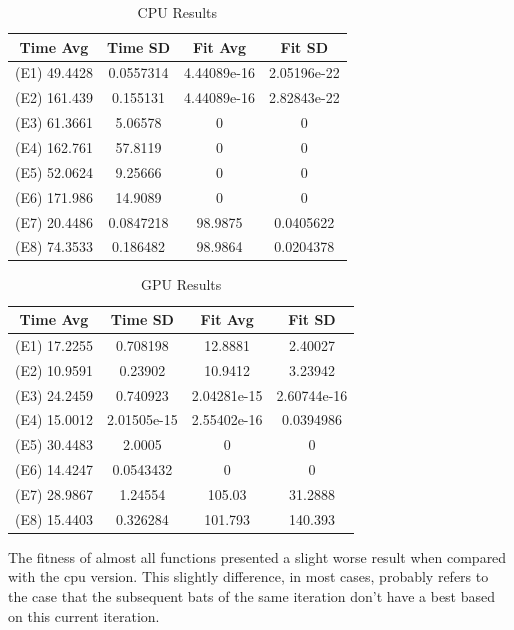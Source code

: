 \documentclass[conference]{IEEEtran}
\begin{document}
\begin{table}[!t]
    \renewcommand{\arraystretch}{1.3}
    \caption{CPU Results}
    \label{results-cpu}
    \centering
    \begin{tabular}{c|c|c|c}
    \hline
        Time Avg & Time SD & Fit Avg & Fit SD\\
    \hline
        (E1) 49.4428 & 0.0557314 & 4.44089e-16 & 2.05196e-22 \\
        (E2) 161.439 & 0.155131 & 4.44089e-16 & 2.82843e-22 \\
        (E3) 61.3661 & 5.06578   & 0  & 0 \\
        (E4) 162.761 & 57.8119 & 0 & 0 \\
        (E5) 52.0624 & 9.25666   & 0  & 0 \\
        (E6) 171.986 & 14.9089 & 0 & 0 \\
        (E7) 20.4486 & 0.0847218 & 98.9875 & 0.0405622 \\
        (E8) 74.3533 & 0.186482 & 98.9864 & 0.0204378 \\
    \end{tabular}
\end{table}

\begin{table}[!t]
    \renewcommand{\arraystretch}{1.3}
    \caption{GPU Results}
    \label{results-gpu}
    \centering
    \begin{tabular}{c|c|c|c}
    \hline
        Time Avg & Time SD & Fit Avg & Fit SD\\
    \hline
        (E1) 17.2255  & 0.708198 &  12.8881 & 2.40027 \\
        (E2) 10.9591  & 0.23902 & 10.9412 & 3.23942 \\
        (E3) 24.2459  & 0.740923  & 2.04281e-15 & 2.60744e-16 \\
        (E4) 15.0012 & 2.01505e-15 & 2.55402e-16 & 0.0394986 \\
        (E5) 30.4483  & 2.0005    & 0 & 0 \\
        (E6) 14.4247 & 0.0543432 & 0 & 0 \\
        (E7) 28.9867 & 1.24554 & 105.03 & 31.2888 \\
        (E8) 15.4403 & 0.326284 & 101.793 & 140.393 \\
    \end{tabular}
\end{table}

The fitness of almost all functions presented a slight worse result
when compared with the cpu version. This slightly difference, in most
cases, probably refers to the case that the subsequent bats of the same
iteration don't have a best based on this current iteration.
\end{document}
